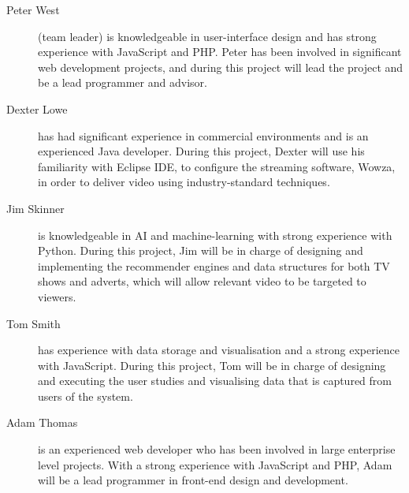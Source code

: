 \begin{description}

\item[Peter West] (team leader) is knowledgeable in user-interface design and has strong experience with JavaScript and PHP. Peter has been involved in significant web development projects, and during this project will lead the project and be a lead programmer and advisor.

\item[Dexter Lowe] has had significant experience in commercial environments and is an experienced Java developer. During this project, Dexter will use his familiarity with Eclipse IDE, to configure the streaming software, Wowza, in order to deliver video using industry-standard techniques.

\item[Jim Skinner] is knowledgeable in AI and machine-learning with strong experience with Python. During this project, Jim will be in charge of designing and implementing the recommender engines and data structures for both TV shows and adverts, which will allow relevant video to be targeted to viewers.

\item[Tom Smith] has experience with data storage and visualisation and a strong experience with JavaScript. During this project, Tom will be in charge of designing and executing the user studies and visualising data that is captured from users of the system.

\item[Adam Thomas] is an experienced web developer who has been involved in large enterprise level projects. With a strong experience with JavaScript and PHP, Adam will be a lead programmer in front-end design and development. 

\end{description}